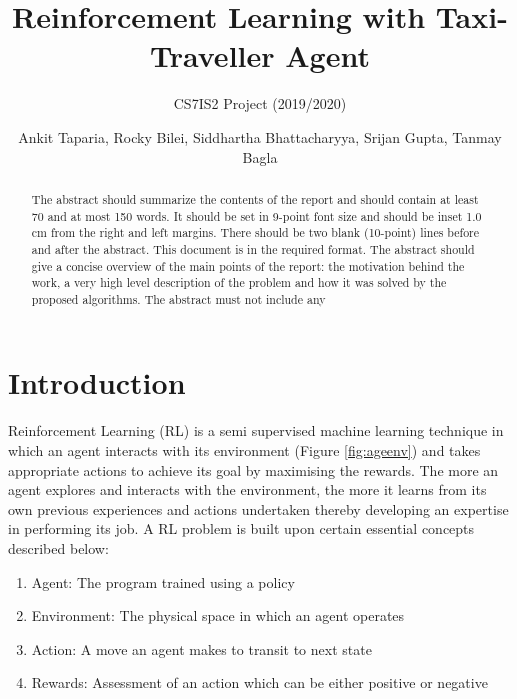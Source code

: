 \documentclass{svproc}
\begin{document}
\mainmatter
\title{Reinforcement Learning with Taxi-Traveller Agent
}
\subtitle{CS7IS2 Project (2019/2020)}
\author{Ankit Taparia, Rocky Bilei, Siddhartha Bhattacharyya, Srijan Gupta, Tanmay Bagla}


\maketitle              %

\begin{abstract}
The abstract should summarize the contents of the report and should contain at least 70 and at most 150 words. It should be set in 9-point font size and should be inset 1.0 cm from the right and left margins. There should be two blank (10-point) lines before and after the abstract. This document is in the required format. The abstract should give a concise overview of the main points of the report: the motivation behind the work, a very high level description of the problem and how it was solved by the proposed algorithms. The abstract must not include any
\end{abstract}
%

\section{Introduction}
Reinforcement Learning (RL) is a semi supervised machine learning technique in which an agent interacts with its environment (Figure \ref{fig:ageenv}) and takes appropriate actions to achieve its goal by maximising the rewards. The more an agent explores and interacts with the environment, the more it learns from its own previous experiences and actions undertaken thereby developing an expertise in performing its job. A RL problem is built upon certain essential concepts described below:
\begin{enumerate}
\item  Agent: The program trained using a policy
\item  Environment: The physical space in which an agent operates
\item  Action: A move an agent makes to transit to next state
\item  Rewards: Assessment of an action which can be either positive or negative
\end{enumerate}
\end{document}
